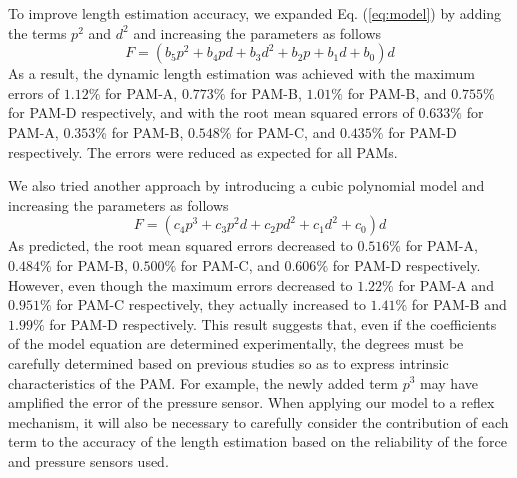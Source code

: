 To improve length estimation accuracy, we expanded Eq. (\ref{eq:model}) by adding the terms $p^2$ and $d^2$ and increasing the parameters as follows
\begin{equation}
\label{eq:model_2d(1)}
F = (b_5p^2 + b_4pd + b_3d^2 + b_2p+b_1d+b_0)d
\end{equation}
As a result, the dynamic length estimation was achieved with the maximum errors of $1.12\%$ for PAM-A, $0.773\%$ for PAM-B, $1.01\%$ for PAM-B, and $0.755\%$ for PAM-D respectively, and with the root mean squared errors of $0.633\%$ for PAM-A, $0.353\%$ for PAM-B, $0.548\%$ for PAM-C, and $0.435\%$ for PAM-D respectively. The errors were reduced as expected for all PAMs. 


We also tried another approach by introducing a cubic polynomial model and increasing the parameters as follows
\begin{equation}
    \label{eq:model_3d}
    F = (c_4p^3+c_3p^2d+c_2pd^2+c_1d^2+c_0)d
\end{equation}
As predicted, the root mean squared errors decreased to $0.516\%$ for PAM-A, $0.484\%$ for PAM-B, $0.500\%$ for PAM-C, and $0.606\%$ for PAM-D respectively. 
However, even though the maximum errors decreased to $1.22\%$ for PAM-A and $0.951\%$ for PAM-C respectively, they actually increased to $1.41\%$ for PAM-B and $1.99\%$ for PAM-D respectively. This result suggests that, even if the coefficients of the model equation are determined experimentally, the degrees must be carefully determined based on previous studies so as to express intrinsic characteristics of the PAM. For example, the newly added term $p^3$ may have amplified the error of the pressure sensor. When applying our model to a reflex mechanism, it will also be necessary to carefully consider the contribution of each term to the accuracy of the length estimation based on the reliability of the force and pressure sensors used.

